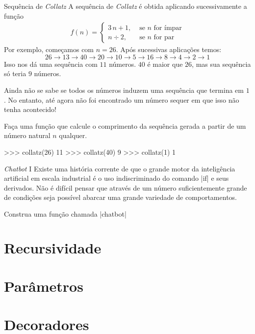 	\begin{problem}{Sequência de \emph{Collatz}}    
	A sequência de \emph{Collatz} é obtida aplicando sucessivamente a função
	{\large
		\begin{align*}
		f(n) = \begin{cases}
		3\, n + 1, &\text{ se } n \text{ for ímpar}\\
		n \div 2, &\text{ se } n \text{ for par}
		\end{cases}
		\end{align*}
	}
	Por exemplo, começamos com $n = 26$. Após sucessivas aplicações temos:
	$$26 \to 13 \to 40 \to 20 \to 10 \to 5 \to 16 \to 8 \to 4 \to 2 \to 1$$
	Isso nos dá uma sequência com $11$ números. $40$ é maior que $26$, mas sua sequência só teria $9$ números.\par

	Ainda não se sabe se todos os números induzem uma sequência que termina em $1$. No entanto, até agora não foi encontrado um número sequer em que isso não tenha acontecido! \par

	\proposal Faça uma função que calcule o comprimento da sequência gerada a partir de um número natural $n$ qualquer. \par
	
	\begin{lstpython}
	>>> collatz(26)
	11
	>>> collatz(40)
	9
	>>> collatz(1)
	1
	\end{lstpython}
	\end{problem}

	\begin{problem}{\textit{Chatbot} I}
	Existe uma história corrente de que o grande motor da inteligência artificial em escala industrial é o uso indiscriminado do comando |if| e seus derivados. Não é difícil pensar que através de um número suficientemente grande de condições seja possível abarcar uma grande variedade de comportamentos. \par

	\proposal Construa uma função chamada |chatbot|
	\end{problem}

	\section*{Recursividade}%
	
	\section*{Parâmetros}%
	
	\section*{Decoradores}%
	
	\endinput